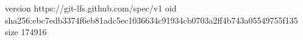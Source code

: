 version https://git-lfs.github.com/spec/v1
oid sha256:ebc7edb3374f6eb81adc5ec1036634c91934cb0703a2ff4b743a05549755f135
size 174916
